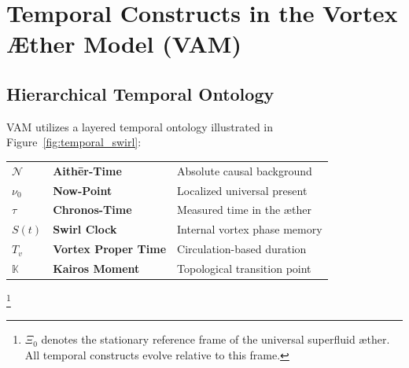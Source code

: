 \section{Temporal Constructs in the Vortex Æther Model (VAM)}\label{sec:temporal-constructs-in-the-vortex-ther-model-(vam)}

\begin{abstract}
This appendix defines and formalizes temporal constructs crucial to the Vortex Æther Model (VAM). By introducing a structured temporal ontology—from absolute universal time (Æther-Time) to locally measurable constructs (Chronos-Time, Swirl Clocks, Vortex Proper Time) and critical transition events (Kairos Moments)—we clarify the dynamics of temporality within structured vortex fields. These constructs form the temporal-topological triad supporting VAM's description of mass, gravity, and quantum phenomena.
\end{abstract}

\subsection{Hierarchical Temporal Ontology}

VAM utilizes a layered temporal ontology illustrated in Figure~\ref{fig:temporal_swirl}:
\begin{center}
\begin{tcolorbox}[
  colback=gray!10,
  colframe=black,
  width=0.9\textwidth,
  sharp corners=southwest,
  boxrule=0.5pt,
  before skip=10pt,
  after skip=10pt,
  title=\textbf{Table: Ætheric Time Modes in the Vortex Æther Model},
  fonttitle=\bfseries,
]
\renewcommand{\arraystretch}{1.25}
\begin{tabular}{@{}lll@{}}
  \(\mathcal{N}\)     & \textbf{Aithēr-Time}         & Absolute causal background \\
  \(\nu_0\)           & \textbf{Now-Point}           & Localized universal present \\
  \(\tau\)            & \textbf{Chronos-Time}        & Measured time in the æther \\
  \(S(t)\)            & \textbf{Swirl Clock}         & Internal vortex phase memory \\
  \(T_v\)             & \textbf{Vortex Proper Time}  & Circulation-based duration \\
  \(\mathbb{K}\)      & \textbf{Kairos Moment}       & Topological transition point \\
\end{tabular}
\end{tcolorbox}
\end{center}
\footnote{\(\Xi_0\) denotes the stationary reference frame of the universal superfluid æther. All temporal constructs evolve relative to this frame.}


